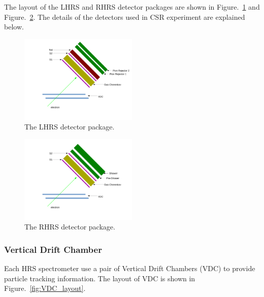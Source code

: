 The layout of the LHRS and RHRS detector packages are shown in Figure.~\ref{fig:LHRS_detectors} and
Figure.~\ref{fig:RHRS_detectors}. The details of the detectors used in CSR experiment are explained below.

\begin{figure}[tb!]
\centering
\includegraphics[width=0.5\textwidth]{figs/LHRS_detectors.pdf}
\caption[The LHRS detector package.]{The LHRS detector package.  \label{fig:LHRS_detectors}}
\end{figure}

\begin{figure}[tb!]
\centering
\includegraphics[width=0.5\textwidth]{figs/RHRS_detectors.pdf}
\caption[The RHRS detector package.]{The RHRS detector package.  \label{fig:RHRS_detectors}}
\end{figure}


\subsubsection{Vertical Drift Chamber}
Each HRS spectrometer use a pair of Vertical Drift Chambers (VDC) to provide particle tracking information.
The layout of VDC is shown in Figure.~\ref{fig:VDC_layout}.

